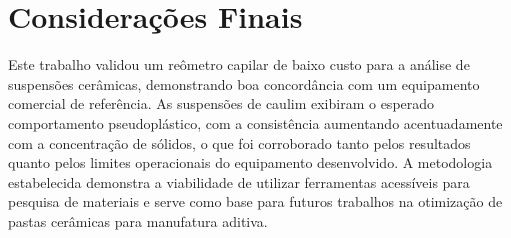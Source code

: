 \documentclass[article,12pt,oneside,a4paper,english,brazil,sumario=tradicional]{abntex2}
\begin{document}
\section{Considerações Finais}
Este trabalho validou um reômetro capilar de baixo custo para a análise de suspensões cerâmicas, demonstrando boa concordância com um equipamento comercial de referência. As suspensões de caulim exibiram o esperado comportamento pseudoplástico, com a consistência aumentando acentuadamente com a concentração de sólidos, o que foi corroborado tanto pelos resultados quanto pelos limites operacionais do equipamento desenvolvido. A metodologia estabelecida demonstra a viabilidade de utilizar ferramentas acessíveis para pesquisa de materiais e serve como base para futuros trabalhos na otimização de pastas cerâmicas para manufatura aditiva.



\renewcommand{\bibsection}{\section*{REFERÊNCIAS}}


\end{document}
